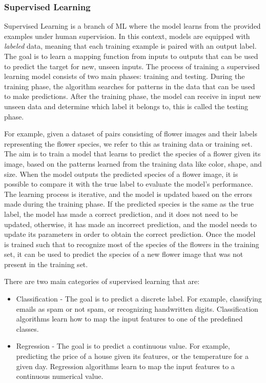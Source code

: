 \subsubsection{Supervised Learning}
\label{subsubsec:supervised_ml}
Supervised Learning is a branch of ML where the model learns from the provided examples under human supervision.
In this context, models are equipped with \textit{labeled} data, meaning that each training example is paired with an output label.
The goal is to learn a mapping function from inputs to outputs that can be used to predict the target for new, unseen inputs.
The process of training a supervised learning model consists of two main phases: training and testing.
During the training phase, the algorithm searches for patterns in the data that can be used to make predictions.
After the training phase, the model can receive in input new unseen data and determine which label it belongs to, this is called the testing phase.

For example, given a dataset of pairs consisting of flower images and their labels representing the flower species, we refer to this as training data or training set.
The aim is to train a model that learns to predict the species of a flower given its image, based on the patterns learned from the training data like color, shape, and size.
When the model outputs the predicted species of a flower image, it is possible to compare it with the true label to evaluate the model's performance.
The learning process is iterative, and the model is updated based on the errors made during the training phase.
If the predicted species is the same as the true label, the model has made a correct prediction, and it does not need to be updated, otherwise, it has made an incorrect prediction, and the model needs to update its parameters in order to obtain the correct prediction.
Once the model is trained such that to recognize most of the species of the flowers in the training set, it can be used to predict the species of a new flower image that was not present in the training set.


There are two main categories of supervised learning that are:
\begin{itemize}
    \item Classification - The goal is to predict a discrete label.
    For example, classifying emails as spam or not spam, or recognizing handwritten digits.
    Classification algorithms learn how to map the input features to one of the predefined classes.

    \item Regression - The goal is to predict a continuous value.
    For example, predicting the price of a house given its features, or the temperature for a given day.
    Regression algorithms learn to map the input features to a continuous numerical value.

\end{itemize}

